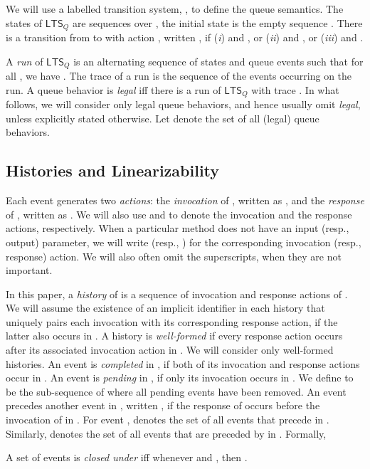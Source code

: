 \documentclass{LMCS}
\newcommand{\ltsq}{\ensuremath{{\mathsf{LTS}}_Q}}
\begin{document}
We will use a labelled transition system, , to define the queue semantics.
The states of {\ltsq} are sequences over , the initial state is the empty sequence . 
There is a transition from  to  with action , written , if
(\textit{i})  and , or 
(\textit{ii})  and , or 
(\textit{iii})  and .

A {\em run} of {\ltsq} is an alternating sequence  of states and queue events such that for all , we have .
The trace of a run is the sequence  of the events occurring on the run.
A queue behavior  is \emph{legal} iff there is a run of {\ltsq} with trace .
In what follows, we will consider only legal queue behaviors, and hence usually omit {\em legal}, unless explicitly stated otherwise.
Let  denote the set of all (legal) queue behaviors.


\subsection*{Histories and Linearizability}

Each event  generates two {\em actions}: the {\em invocation} of , written as , and the {\em response} of , written as .
We will also use  and  to denote the invocation and the response actions, respectively. 
When a particular method  does not have an input (resp., output) parameter, we will write
 (resp., ) for the corresponding invocation (resp., response) action. 
We will also often omit the superscripts, when they are not important.

In this paper, a {\em history} of  is a sequence of invocation and response actions of . 
We will assume the existence of an implicit identifier in each history  that uniquely pairs each invocation with its corresponding response action, if the latter also occurs in .
A history  is {\em well-formed} if every response action occurs after its associated invocation action in .
We will consider only well-formed histories.
An event is {\em completed} in , if both of its invocation and response actions occur in .
An event is {\em pending} in , if only its invocation occurs in .
We define  to be the sub-sequence of  where all pending events have been removed.
An event  precedes another event  in , written , if the response of  occurs before the invocation of  in .
For event ,  denotes the set of all events that precede  in . 
Similarly,  denotes the set of all events that are preceded by  in .
Formally, 

A set of events  is {\em closed under } iff whenever  and , then .
\end{document}
